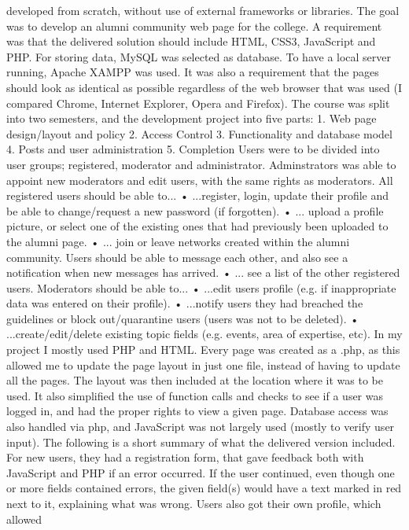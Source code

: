 developed from scratch, without use of external frameworks or libraries. The goal was to develop
an alumni community web page for the college. A requirement was that the delivered solution
should include HTML, CSS3, JavaScript and PHP. For storing data, MySQL was selected as
database. To have a local server running, Apache XAMPP was used. It was also a requirement
that the pages should look as identical as possible regardless of the web browser that was used (I
compared Chrome, Internet Explorer, Opera and Firefox).
The course was split into two semesters, and the development project into five parts:
1. Web page design/layout and policy
2. Access Control
3. Functionality and database model
4. Posts and user administration
5. Completion
Users were to be divided into user groups; registered, moderator and administrator. Adminstrators
was able to appoint new moderators and edit users, with the same rights as moderators.
All registered users should be able to...
• ...register, login, update their profile and be able to change/request a new password (if
forgotten).
• ... upload a profile picture, or select one of the existing ones that had previously been
uploaded to the alumni page.
• ... join or leave networks created within the alumni community. Users should be able to
message each other, and also see a notification when new messages has arrived.
• ... see a list of the other registered users.
Moderators should be able to...
• ...edit users profile (e.g. if inappropriate data was entered on their profile).
• ...notify users they had breached the guidelines or block out/quarantine users (users was
not to be deleted).
• ...create/edit/delete existing topic fields (e.g. events, area of expertise, etc).
In my project I mostly used PHP and HTML. Every page was created as a .php, as this allowed me
to update the page layout in just one file, instead of having to update all the pages. The layout was
then included at the location where it was to be used. It also simplified the use of function calls and
checks to see if a user was logged in, and had the proper rights to view a given page. Database
access was also handled via php, and JavaScript was not largely used (mostly to verify user input).
The following is a short summary of what the delivered version included. For new users, they had a
registration form, that gave feedback both with JavaScript and PHP if an error occurred. If the user
continued, even though one or more fields contained errors, the given field(s) would have a text
marked in red next to it, explaining what was wrong. Users also got their own profile, which allowed
